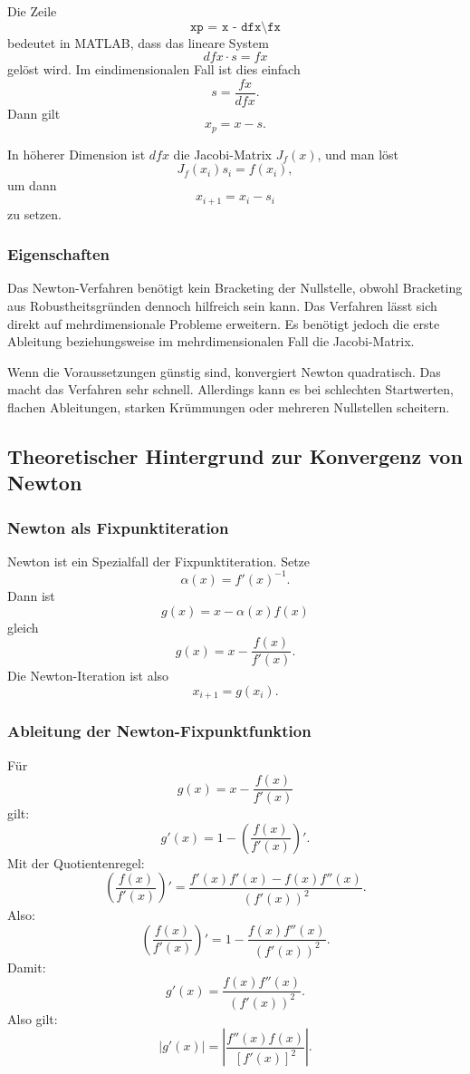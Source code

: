 \documentclass[10pt, letterpaper]{article}
\begin{document}
Die Zeile
\[
\texttt{xp = x - dfx\textbackslash fx}
\]
bedeutet in MATLAB, dass das lineare System
\[
dfx\cdot s=fx
\]
gelöst wird. Im eindimensionalen Fall ist dies einfach
\[
s=\frac{fx}{dfx}.
\]
Dann gilt
\[
x_{p}=x-s.
\]

In höherer Dimension ist \(dfx\) die Jacobi-Matrix \(J_f(x)\), und man löst
\[
J_f(x_i)s_i=f(x_i),
\]
um dann
\[
x_{i+1}=x_i-s_i
\]
zu setzen.

\subsubsection{Eigenschaften}

Das Newton-Verfahren benötigt kein Bracketing der Nullstelle, obwohl Bracketing aus Robustheitsgründen dennoch hilfreich sein kann. Das Verfahren lässt sich direkt auf mehrdimensionale Probleme erweitern. Es benötigt jedoch die erste Ableitung beziehungsweise im mehrdimensionalen Fall die Jacobi-Matrix.

Wenn die Voraussetzungen günstig sind, konvergiert Newton quadratisch. Das macht das Verfahren sehr schnell. Allerdings kann es bei schlechten Startwerten, flachen Ableitungen, starken Krümmungen oder mehreren Nullstellen scheitern.

\subsection{Theoretischer Hintergrund zur Konvergenz von Newton}

\subsubsection{Newton als Fixpunktiteration}

Newton ist ein Spezialfall der Fixpunktiteration. Setze
\[
\alpha(x)=f'(x)^{-1}.
\]
Dann ist
\[
g(x)=x-\alpha(x)f(x)
\]
gleich
\[
g(x)=x-\frac{f(x)}{f'(x)}.
\]
Die Newton-Iteration ist also
\[
x_{i+1}=g(x_i).
\]

\subsubsection{Ableitung der Newton-Fixpunktfunktion}

Für
\[
g(x)=x-\frac{f(x)}{f'(x)}
\]
gilt:
\[
g'(x)
=
1-
\left(\frac{f(x)}{f'(x)}\right)'.
\]
Mit der Quotientenregel:
\[
\left(\frac{f(x)}{f'(x)}\right)'
=
\frac{f'(x)f'(x)-f(x)f''(x)}
{(f'(x))^2}.
\]
Also:
\[
\left(\frac{f(x)}{f'(x)}\right)'
=
1-
\frac{f(x)f''(x)}{(f'(x))^2}.
\]
Damit:
\[
g'(x)
=
\frac{f(x)f''(x)}
{(f'(x))^2}.
\]
Also gilt:
\[
\boxed{
|g'(x)|
=
\left|
\frac{f''(x)f(x)}
{[f'(x)]^2}
\right|.
}
\]
\end{document}

